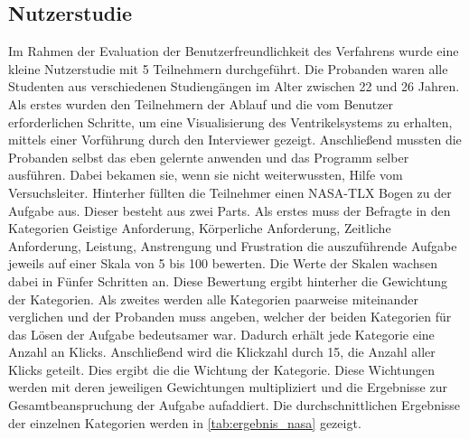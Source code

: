 \subsection{Nutzerstudie}


Im Rahmen der Evaluation der Benutzerfreundlichkeit des Verfahrens wurde eine kleine Nutzerstudie mit 5 Teilnehmern durchgeführt. Die Probanden waren alle Studenten aus verschiedenen Studiengängen im Alter zwischen 22 und 26 Jahren.
\newline
Als erstes wurden den Teilnehmern der Ablauf und die vom Benutzer erforderlichen Schritte, um eine Visualisierung des Ventrikelsystems zu erhalten, mittels einer Vorführung durch den Interviewer gezeigt.
\newline
Anschließend mussten die Probanden selbst das eben gelernte anwenden und das Programm selber ausführen. Dabei bekamen sie, wenn sie nicht weiterwussten, Hilfe vom Versuchsleiter.
\newline
Hinterher füllten die Teilnehmer einen NASA-TLX Bogen zu der Aufgabe aus. Dieser besteht aus zwei Parts. Als erstes muss der Befragte in den Kategorien Geistige Anforderung, Körperliche Anforderung, Zeitliche Anforderung, Leistung, Anstrengung und Frustration die auszuführende Aufgabe jeweils auf einer Skala von 5 bis 100 bewerten. Die Werte der Skalen wachsen dabei in Fünfer Schritten an. Diese Bewertung ergibt hinterher die Gewichtung der Kategorien.
\newline
Als zweites werden alle Kategorien paarweise miteinander verglichen und der Probanden muss angeben, welcher der beiden Kategorien für das Lösen der Aufgabe bedeutsamer war. Dadurch erhält jede Kategorie eine Anzahl an Klicks.
\newline
Anschließend wird die Klickzahl durch 15, die Anzahl aller Klicks geteilt. Dies ergibt die die Wichtung der Kategorie. Diese Wichtungen werden mit deren jeweiligen Gewichtungen multipliziert und die Ergebnisse zur Gesamtbeanspruchung der Aufgabe aufaddiert.
\newline
Die durchschnittlichen Ergebnisse der einzelnen Kategorien werden in \autoref{tab:ergebnis_nasa} gezeigt.


\begin{table}[H]
\centering
{}
\caption{Durchschnittlichen Ergebnisse des NASA-TLX Bogens}
\label{tab:ergebnis_nasa}
\end{table}



